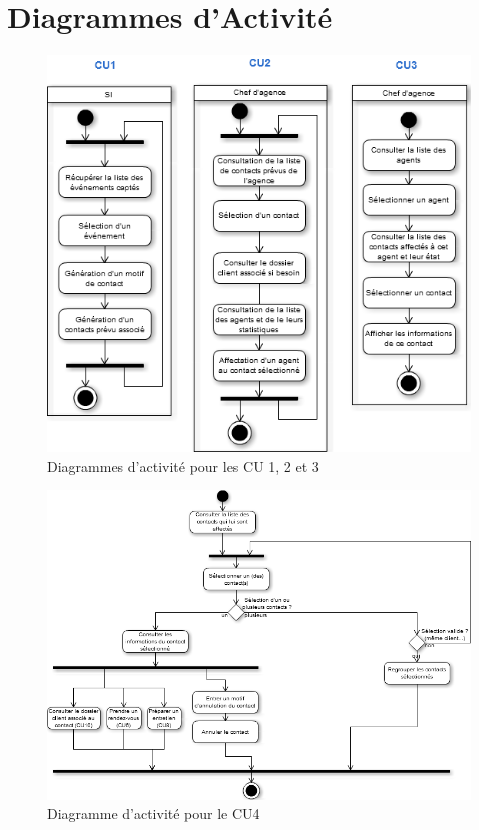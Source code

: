 \section{Diagrammes d'Activité}

\begin{figure}[H]
	\begin{center}
		\includegraphics[scale=0.4]{Includes/SOA-Activite-CU1-2-3.png}
		\caption{Diagrammes d'activité pour les CU 1, 2 et 3}
	\end{center}
\end{figure}

\begin{figure}[H]
	\begin{center}
		\includegraphics[scale=0.4]{Includes/SOA-Activite-CU4.png}
		\caption{Diagramme d'activité pour le CU4}
	\end{center}
\end{figure}

